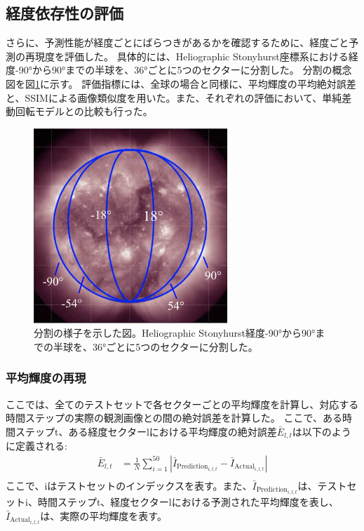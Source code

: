     \subsection{経度依存性の評価}
        さらに、予測性能が経度ごとにばらつきがあるかを確認するために、経度ごと予測の再現度を評価した。
        具体的には、Heliographic Stonyhurst座標系における経度-90°から90°までの半球を、36°ごとに5つのセクターに分割した。
        分割の概念図を図\ref{fig:exp1_division_concept}に示す。
        評価指標には、全球の場合と同様に、平均輝度の平均絶対誤差と、SSIMによる画像類似度を用いた。また、それぞれの評価において、単純差動回転モデルとの比較も行った。
        \begin{figure}[htbp]
          \centering
          \includegraphics[width=0.65\textwidth]{figures/exp1/devision_caption.jpg}
          \caption{分割の様子を示した図。Heliographic Stonyhurst経度-90°から90°までの半球を、36°ごとに5つのセクターに分割した。}
          \label{fig:exp1_division_concept}
        \end{figure}

        \subsubsection{平均輝度の再現}
          ここでは、全てのテストセットで各セクターごとの平均輝度を計算し、対応する時間ステップの実際の観測画像との間の絶対誤差を計算した。
          ここで、ある時間ステップt、ある経度セクターlにおける平均輝度の絶対誤差\( \bar{E}_{l,t} \)は以下のように定義される:
          \begin{align}
            \bar{E}_{l, t} & = \frac{1}{N} \sum_{i=1}^{50} | \bar{I}_{\text{Prediction}_ {i, l, t}} - \bar{I}_{\text{Actual}_{i, l, t}} | \\
          \end{align}
          ここで、iはテストセットのインデックスを表す。また、\( \bar{I}_{\text{Prediction}_{i, l, t}} \)は、テストセットi、時間ステップt、経度セクターlにおける予測された平均輝度を表し、\( \bar{I}_{\text{Actual}_{i, l, t}} \)は、実際の平均輝度を表す。  
            
